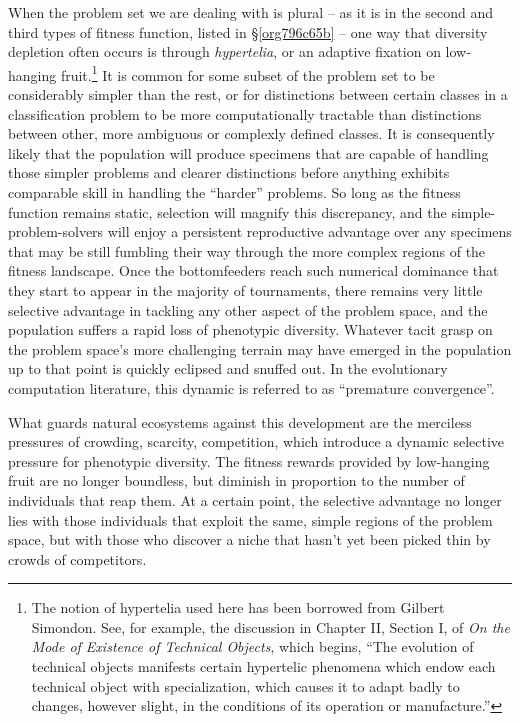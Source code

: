 \documentclass[12pt,glossary]{dalthesis}
\begin{document}
When the problem set we are dealing with is plural -- as it is in the second and third types
of fitness function, listed in \S \ref{org796c65b} -- one way that diversity depletion often
occurs is through \emph{hypertelia}, or an adaptive fixation on low-hanging fruit.\footnote{The notion of hypertelia used here has been borrowed from Gilbert Simondon. See,
  for example, the discussion in Chapter II, Section I, of 
  \emph{On the Mode of Existence of Technical Objects}, which begins, ``The evolution of technical objects manifests certain hypertelic phenomena which
  endow each technical object with specialization, which causes it to adapt badly
  to changes, however slight, in the conditions of its operation or manufacture.''} 
It is common for some subset of the problem set to be considerably simpler than the rest,
or for distinctions between certain classes in a classification problem to be more computationally
tractable than distinctions between other, more ambiguous or complexly defined classes. 
It is consequently likely that the population will produce specimens that are capable of
handling those simpler problems and clearer distinctions before anything exhibits comparable
skill in handling the ``harder'' problems. So long as the fitness function remains static,
selection will magnify this discrepancy, and the simple-problem-solvers will enjoy a persistent
reproductive advantage over any specimens that may be still fumbling their way through the
more complex regions of the fitness landscape. Once the bottomfeeders reach such numerical
dominance that they start to appear in the majority of tournaments, there remains very little
selective advantage in tackling any other aspect of the problem space, and the population
suffers a rapid loss of phenotypic diversity. Whatever tacit grasp on the problem
space's more challenging terrain may have emerged in the population up to that point is
quickly eclipsed and snuffed out. In the evolutionary computation literature, this dynamic
is referred to as ``premature convergence''. 

What guards natural ecosystems against this development are the merciless
pressures of crowding, scarcity, competition, which introduce a dynamic selective
pressure for phenotypic diversity. The fitness rewards provided by low-hanging
fruit are no longer boundless, but diminish in proportion to the number of
individuals that reap them. At a certain point, the selective advantage no longer
lies with those individuals that exploit the same, simple regions of the problem
space, but with those who discover a niche that hasn't yet been picked thin by
crowds of competitors.
\end{document}
